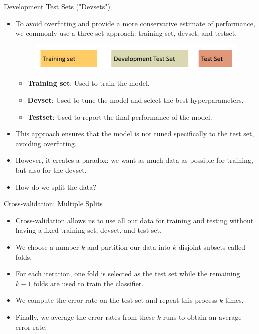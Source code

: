 \documentclass[handout]{beamer}
\begin{document}
\begin{frame}{Development Test Sets ("Devsets")}
\scriptsize

\begin{itemize}
 \item To avoid overfitting and provide a more conservative estimate of performance, we commonly use a three-set approach: training set, devset, and testset.
\begin{figure}[h]
\includegraphics[scale = 0.23]{pics/devsets.png}
\end{figure}

\begin{itemize}\scriptsize
\item \textbf{Training set}: Used to train the model.
\item \textbf{Devset}: Used to tune the model and select the best hyperparameters.
\item \textbf{Testset}: Used to report the final performance of the model.
\end{itemize}


\item This approach ensures that the model is not tuned specifically to the test set, avoiding overfitting.
\item However, it creates a paradox: we want as much data as possible for training, but also for the devset.
\item How do we split the data?

\end{itemize}



\end{frame}


\begin{frame}{Cross-validation: Multiple Splits}
\scriptsize
\begin{itemize}
\item Cross-validation allows us to use all our data for training and testing without having a fixed training set, devset, and test set.
\item We choose a number $k$ and partition our data into $k$ disjoint subsets called folds.
\item For each iteration, one fold is selected as the test set while the remaining $k-1$ folds are used to train the classifier.
\item We compute the error rate on the test set and repeat this process $k$ times.
\item Finally, we average the error rates from these $k$ runs to obtain an average error rate.
\end{itemize}
\end{frame}
\end{document}
